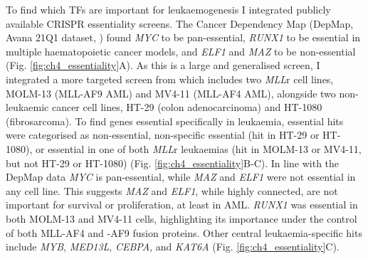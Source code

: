 To find which TFs are important for leukaemogenesis I integrated publicly available CRISPR essentiality screens. The Cancer Dependency Map (DepMap, Avana 21Q1 dataset, \cite{meyers_computational_2017, doench_optimized_2016}) found \textit{MYC} to be pan-essential, \textit{RUNX1} to be essential in multiple haematopoietic cancer models, and \textit{ELF1} and \textit{MAZ} to be non-essential (Fig. \ref{fig:ch4_essentiality}A). As this is a large and generalised screen, I integrated a more targeted screen from \cite{tzelepis_crispr_2016} which includes two \textit{MLL}r cell lines, MOLM-13 (MLL-AF9 AML) and MV4-11 (MLL-AF4 AML), alongside two non-leukaemic cancer cell lines, HT-29 (colon adenocarcinoma) and HT-1080 (fibrosarcoma). To find genes essential specifically in leukaemia, essential hits were categorised as non-essential, non-specific essential (hit in HT-29 or HT-1080), or essential in one of both \textit{MLL}r leukaemias (hit in MOLM-13 or MV4-11, but not HT-29 or HT-1080) (Fig. \ref{fig:ch4_essentiality}B-C). In line with the DepMap data \textit{MYC} is pan-essential, while \textit{MAZ} and \textit{ELF1} were not essential in any cell line. This suggests \textit{MAZ} and \textit{ELF1}, while highly connected, are not important for survival or proliferation, at least in AML. \textit{RUNX1} was essential in both MOLM-13 and MV4-11 cells, highlighting its importance under the control of both MLL-AF4 and -AF9 fusion proteins. Other central leukaemia-specific hits include \textit{MYB}, \textit{MED13L}, \textit{CEBPA}, and \textit{KAT6A} (Fig. \ref{fig:ch4_essentiality}C). 

